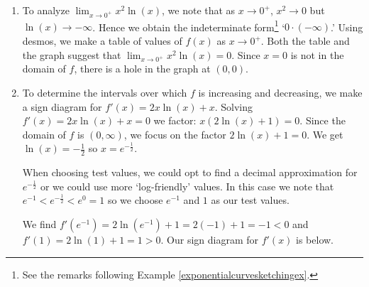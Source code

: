 \documentclass{ximera}
\begin{document}
\begin{example}
\begin{explanation}
\begin{enumerate}
\item   To analyze $\lim_{x \rightarrow 0^{+}} x^2 \ln(x)$, we note that as $x \rightarrow 0^{+}$, $x^2 \rightarrow 0$ but $\ln(x) \rightarrow -\infty$.  Hence we obtain the indeterminate form\footnote{See the remarks following Example \ref{exponentialcurvesketchingex}.} `$0 \cdot (- \infty)$.'  Using desmos, we make a table of values of $f(x)$ as $x \rightarrow 0^{+}$.  Both the table and the graph suggest that  $\lim_{x \rightarrow 0^{+}} x^2 \ln(x) = 0$.  Since $x = 0$ is not in the domain of $f$, there is a hole in the graph at $(0,0)$.

\begin{center}
\end{center}

\item  To determine the intervals over which $f$ is increasing and decreasing, we make a sign diagram for $f'(x) = 2x \ln(x) + x$.  Solving $f'(x) = 2x \ln(x) + x = 0$ we factor: $x(2\ln(x) + 1) = 0$.  Since the domain of $f$ is $(0,
\infty)$, we focus on the factor $2\ln(x) + 1 = 0$.  We get $\ln(x) = -\frac{1}{2}$ so $x = e^{-\frac{1}{2}}$.  

When choosing test values, we could opt to find a decimal approximation for $e^{-\frac{1}{2}}$ or we could use more `log-friendly' values.  In this case we note that $e^{-1} < e^{-\frac{1}{2}} < e^{0} = 1$ so we choose $e^{-1}$ and $1$ as our test values.

We find $f'\left(e^{-1}\right) = 2 \ln\left(e^{-1}\right) + 1 = 2(-1) + 1 = -1 <0$ and $f'(1) = 2 \ln(1) + 1 = 1 > 0$.  Our sign diagram for $f'(x)$ is below.

\begin{image}
\end{image}
\end{enumerate}
\end{explanation}
\end{example}
\end{document}

